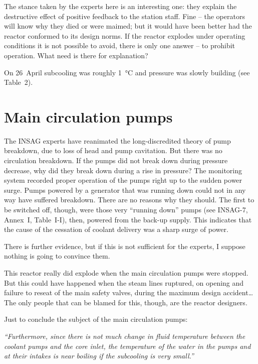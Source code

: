 \documentclass[openright]{bookest}
\begin{document}
The stance taken by the experts here is an interesting one: they explain the destructive effect of positive feedback to the station staff. Fine -- the operators will know why they died or were maimed; but it would have been better had the reactor conformed to its design norms. If the reactor explodes under operating conditions it is not possible to avoid, there is only one answer -- to prohibit operation. What need is there for explanation?

On 26~April subcooling was roughly \qty{1}{\celsius} and pressure was slowly building (see Table~2).

\section*{Main circulation pumps}

The INSAG experts have reanimated the long-discredited theory of pump breakdown, due to loss of head and pump cavitation. But there was no circulation breakdown. If the pumps did not break down during pressure decrease, why did they break down during a rise in pressure? The monitoring system recorded proper operation of the pumps right up to the sudden power surge. Pumps powered by a generator that was running down could not in any way have suffered breakdown. There are no reasons why they should. The first to be switched off, though, were those very ``running down'' pumps (see INSAG-7, Annex~I, Table~I-I), then, powered from the back-up supply. This indicates that the cause of the cessation of coolant delivery was a sharp surge of power.

There is further evidence, but if this is not sufficient for the experts, I suppose nothing is going to convince them.

This reactor really did explode when the main circulation pumps were stopped. But this could have happened when the steam lines ruptured, on opening and failure to reseat of the main safety valves, during the maximum design accident\ldots{} The only people that can be blamed for this, though, are the reactor designers.

Just to conclude the subject of the main circulation pumps:

\begin{personal}[INSAG-7 (§2.8):]
\textit{``Furthermore, since there is not much change in fluid temperature between the coolant pumps and the core inlet, the temperature of the water in the pumps and at their intakes is near boiling if the subcooling is very small.''}
\end{personal}
\end{document}
